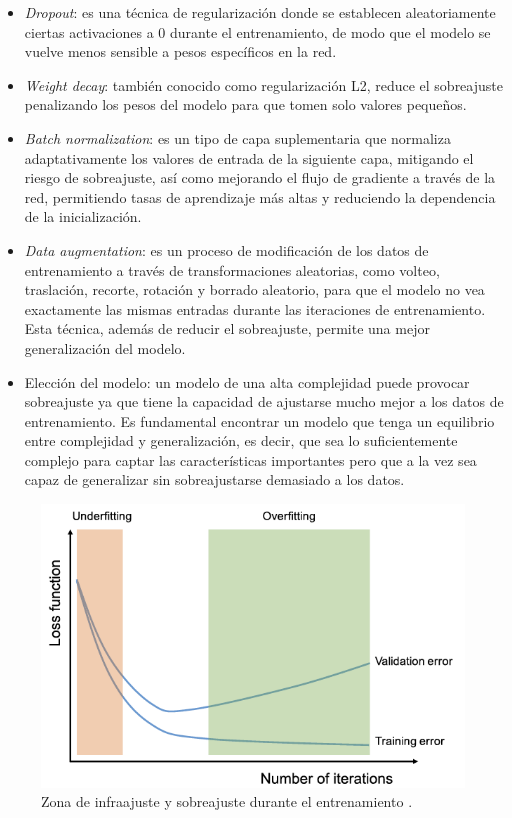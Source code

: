 \begin{itemize}
	\item \textit{Dropout}: es una técnica de regularización donde se establecen aleatoriamente ciertas activaciones a 0 durante el entrenamiento, de modo que el modelo se vuelve menos sensible a pesos específicos en la red.
	\item \textit{Weight decay}: también conocido como regularización L2, reduce el sobreajuste penalizando los pesos del modelo para que tomen solo valores pequeños.
	\item \textit{Batch normalization}: es un tipo de capa suplementaria que normaliza adaptativamente los valores de entrada de la siguiente capa, mitigando el riesgo de sobreajuste, así como mejorando el flujo de gradiente a través de la red, permitiendo tasas de aprendizaje más altas y reduciendo la dependencia de la inicialización.
	\item \textit{Data augmentation}: es un proceso de modificación de los datos de entrenamiento a través de transformaciones aleatorias, como volteo, traslación, recorte, rotación y borrado aleatorio, para que el modelo no vea exactamente las mismas entradas durante las iteraciones de entrenamiento. Esta técnica, además de reducir el sobreajuste, permite una mejor generalización del modelo.
	\item Elección del modelo: un modelo de una alta complejidad puede provocar sobreajuste ya que tiene la capacidad de ajustarse mucho mejor a los datos de entrenamiento. Es fundamental encontrar un modelo que tenga un equilibrio entre complejidad y generalización, es decir, que sea lo suficientemente complejo para captar las características importantes pero que a la vez sea capaz de generalizar sin sobreajustarse demasiado a los datos.
\end{itemize}

\begin{figure}[h]
	\centering
	\includegraphics[scale=0.8]{imagenes/cap2/sobreajuste.png}
	\caption[Infraajuste y sobreajuste en entrenamiento.]{Zona de infraajuste y sobreajuste durante el entrenamiento \cite{40}.}
	\label{fig10}
\end{figure}

